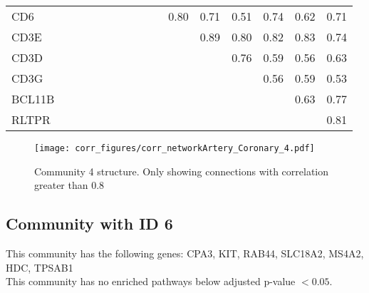 \begin{longtable}{lrrrrrrrrrrrrrrr}
CD6    &           &             &            &            &             &            &           &            &           &       0.80 &       0.71 &       0.51 &         0.74 &        0.62 &        0.71 \\
CD3E   &           &             &            &            &             &            &           &            &           &            &       0.89 &       0.80 &         0.82 &        0.83 &        0.74 \\
CD3D   &           &             &            &            &             &            &           &            &           &            &            &       0.76 &         0.59 &        0.56 &        0.63 \\
CD3G   &           &             &            &            &             &            &           &            &           &            &            &            &         0.56 &        0.59 &        0.53 \\
BCL11B &           &             &            &            &             &            &           &            &           &            &            &            &              &        0.63 &        0.77 \\
RLTPR  &           &             &            &            &             &            &           &            &           &            &            &            &              &             &        0.81 \\
\end{longtable}


\begin{figure}[h!]
\centering
\texttt{[image: corr\_figures/corr\_networkArtery\_Coronary\_4.pdf]}
\caption{Community 4 structure. Only showing connections with correlation greater than 0.8}
\end{figure}




\subsection*{Community with ID 6}
This community has the following genes: CPA3, KIT, RAB44, SLC18A2, MS4A2, HDC, TPSAB1
\\
This community has no enriched pathways below adjusted p-value $< 0.05$.

